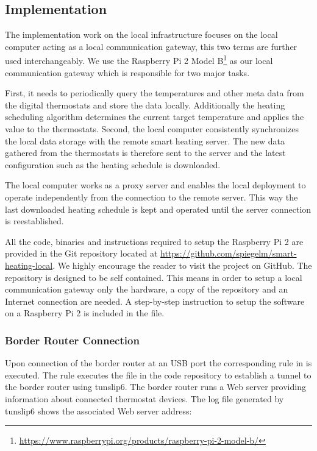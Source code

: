 \subsection{Implementation}
\label{sec:local_infrastructure_implementation}

The implementation work on the local infrastructure focuses on the local computer acting as a local communication gateway, this two terms are further used interchangeably.
We use the Raspberry Pi 2 Model B\footnote{\url{https://www.raspberrypi.org/products/raspberry-pi-2-model-b/}} as our local communication gateway which is responsible for two major tasks.

First, it needs to periodically query the temperatures and other meta data from the digital thermostats and store the data locally.
Additionally the heating scheduling algorithm determines the current target temperature and applies the value to the thermostats.
Second, the local computer consistently synchronizes the local data storage with the remote smart heating server.
The new data gathered from the thermostats is therefore sent to the server and the latest configuration such as the heating schedule is downloaded.

The local computer works as a proxy server and enables the local deployment to operate independently from the connection to the remote server.
This way the last downloaded heating schedule is kept and operated until the server connection is reestablished.

All the code, binaries and instructions required to setup the Raspberry Pi 2 are provided in the Git repository located at \url{https://github.com/spiegelm/smart-heating-local}.
We highly encourage the reader to visit the project on GitHub.
The repository is designed to be self contained.
This means in order to setup a local communication gateway only the hardware, a copy of the repository and an Internet connection are needed.
A step-by-step instruction to setup the software on a Raspberry Pi 2 is included in the  file.

\subsubsection{Border Router Connection}

Upon connection of the border router at an USB port the corresponding rule in  is executed.
The rule executes the file  in the code repository to establish a tunnel to the border router using tunslip6.
The border router runs a Web server providing information about connected thermostat devices.
The log file  generated by tunslip6 shows the associated Web server address:

